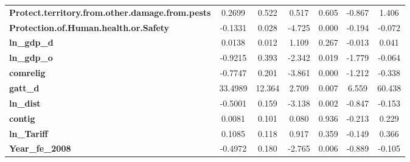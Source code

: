 \begin{center}
\begin{tabular}{lcccccc}
\textbf{Protect.territory.from.other.damage.from.pests}            &       0.2699  &        0.522     &     0.517  &         0.605        &       -0.867    &        1.406     \\
\textbf{Protection.of.Human.health.or.Safety}                      &      -0.1331  &        0.028     &    -4.725  &         0.000        &       -0.194    &       -0.072     \\
\textbf{ln\_gdp\_d}                                                &       0.0138  &        0.012     &     1.109  &         0.267        &       -0.013    &        0.041     \\
\textbf{ln\_gdp\_o}                                                &      -0.9215  &        0.393     &    -2.342  &         0.019        &       -1.779    &       -0.064     \\
\textbf{comrelig}                                                  &      -0.7747  &        0.201     &    -3.861  &         0.000        &       -1.212    &       -0.338     \\
\textbf{gatt\_d}                                                   &      33.4989  &       12.364     &     2.709  &         0.007        &        6.559    &       60.438     \\
\textbf{ln\_dist}                                                  &      -0.5001  &        0.159     &    -3.138  &         0.002        &       -0.847    &       -0.153     \\
\textbf{contig}                                                    &       0.0081  &        0.101     &     0.080  &         0.936        &       -0.213    &        0.229     \\
\textbf{ln\_Tariff}                                                &       0.1085  &        0.118     &     0.917  &         0.359        &       -0.149    &        0.366     \\
\textbf{Year\_fe\_2008}                                            &      -0.4972  &        0.180     &    -2.765  &         0.006        &       -0.889    &       -0.105     \\
\bottomrule
\end{tabular}
\end{center}